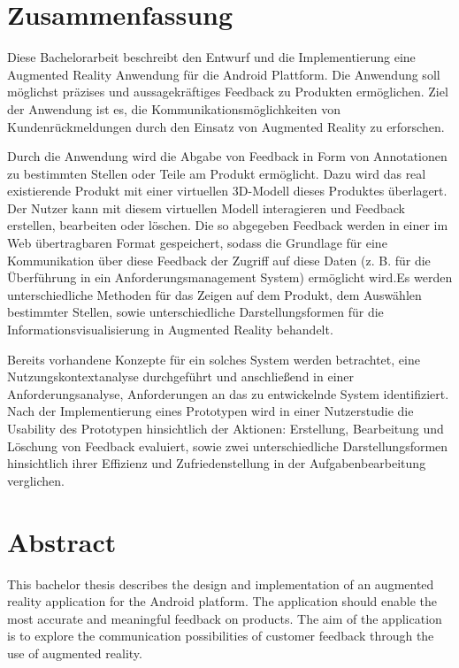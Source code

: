 \section*{Zusammenfassung}

Diese Bachelorarbeit beschreibt den Entwurf und die Implementierung eine Augmented Reality Anwendung für die Android Plattform. Die Anwendung soll möglichst präzises und aussagekräftiges Feedback zu Produkten ermöglichen.
Ziel der Anwendung ist es, die Kommunikationsmöglichkeiten von Kundenrückmeldungen durch den Einsatz von Augmented Reality zu erforschen.

Durch die Anwendung wird die Abgabe von Feedback in Form von Annotationen zu bestimmten Stellen oder Teile am Produkt ermöglicht. Dazu wird das real existierende Produkt mit einer 
virtuellen 3D-Modell dieses Produktes überlagert. Der Nutzer kann mit diesem virtuellen Modell interagieren und Feedback erstellen, bearbeiten oder löschen. Die so abgegeben Feedback werden 
in einer im Web übertragbaren Format gespeichert, sodass die Grundlage für eine Kommunikation über diese Feedback der Zugriff auf diese Daten (z. B. für die Überführung in ein Anforderungsmanagement System) 
ermöglicht wird.Es werden unterschiedliche Methoden für das Zeigen auf dem Produkt, dem Auswählen bestimmter Stellen, sowie unterschiedliche Darstellungsformen für die Informationsvisualisierung in Augmented Reality 
behandelt. 

Bereits vorhandene Konzepte für ein solches System werden betrachtet, eine Nutzungskontextanalyse durchgeführt und anschließend in einer Anforderungsanalyse, Anforderungen an das zu entwickelnde System identifiziert. 
Nach der Implementierung eines Prototypen wird in einer Nutzerstudie die Usability des Prototypen hinsichtlich der Aktionen: Erstellung, Bearbeitung und Löschung von Feedback evaluiert, sowie zwei unterschiedliche
Darstellungsformen hinsichtlich ihrer Effizienz und Zufriedenstellung in der Aufgabenbearbeitung verglichen.

\section*{Abstract}

This bachelor thesis describes the design and implementation of an augmented reality application for the Android platform. The application should enable the most accurate and meaningful feedback on products.
The aim of the application is to explore the communication possibilities of customer feedback through the use of augmented reality.

